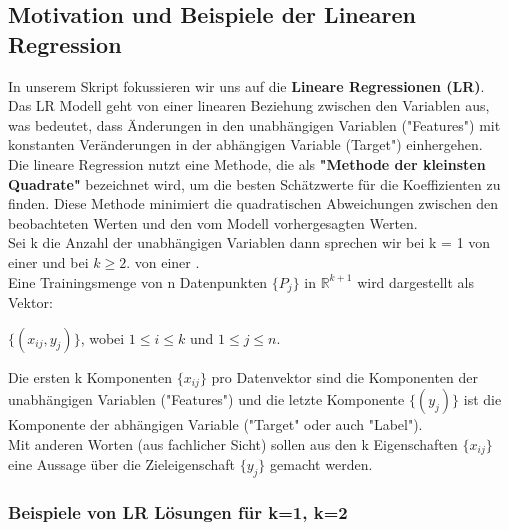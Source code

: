 \documentclass[12pt]{article}
\begin{document}
\subsection{Motivation und Beispiele der Linearen Regression}

In unserem Skript fokussieren wir uns auf die \textbf{Lineare Regressionen (LR)}.
Das LR Modell geht von einer linearen Beziehung zwischen den Variablen aus, was bedeutet, dass Änderungen in den unabhängigen Variablen ("Features") mit konstanten Veränderungen in der abhängigen Variable (Target") einhergehen.\\
Die lineare Regression nutzt eine Methode, die als \textbf{"Methode der kleinsten Quadrate"} bezeichnet wird, um die besten Schätzwerte für die Koeffizienten zu finden. Diese Methode minimiert die quadratischen Abweichungen zwischen den beobachteten Werten und den vom Modell vorhergesagten Werten. \\
Sei k die Anzahl der unabhängigen Variablen dann sprechen wir bei k = 1 von einer {\color{blue}{"Einfachen (simple) Linearen Regression" (sLR)}} und bei $k\geqslant 2.$ von einer {\color{blue}{"Multidimensionalen (multiplen) Linearen Regression"(mLR)}}.\\
Eine Trainingsmenge von n Datenpunkten $\lbrace P_j \rbrace$ in $\mathbb{R}^{k+1} $ wird dargestellt als Vektor: 
\begin{center}
$ \lbrace(x_{ij},y_j) \rbrace$,  wobei $1 \leq i \leq k $ und $1 \leq j \leq n $.\\
\end{center} 
Die ersten k Komponenten $\lbrace x_{ij} \rbrace $ pro Datenvektor sind die Komponenten der unabhängigen Variablen ("Features") und die letzte Komponente $ \lbrace(y_j)\rbrace $ ist die Komponente der abhängigen Variable ("Target" oder auch "Label").\\  Mit anderen Worten (aus fachlicher Sicht) sollen aus den k Eigenschaften $\lbrace x_{ij} \rbrace$ eine Aussage über die Zieleigenschaft $\lbrace y_j \rbrace$ gemacht werden.   

\subsubsection{Beispiele von LR Lösungen für k=1, k=2}
\end{document}
